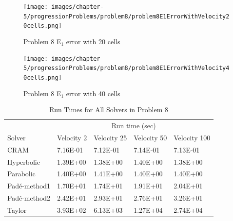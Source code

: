 \clearpage

\begin{figure}[p]
    \centering
    \texttt{[image: images/chapter-5/progressionProblems/problem8/problem8E1ErrorWithVelocity20cells.png]}
    \caption{Problem 8 E${}_{1}$ error with 20 cells}
    \label{fig:problem8_E1_error_20cells}
\end{figure}

\clearpage

\begin{figure}[p]
    \centering
    \texttt{[image: images/chapter-5/progressionProblems/problem8/problem8E1ErrorWithVelocity40cells.png]}
    \caption{Problem 8 E${}_{1}$ error with 40 cells}
    \label{fig:problem8_E1_error_40cells}
\end{figure}

\clearpage

\begin{table}[p]
   \caption{\label{tab:problem8_run_times} Run Times for All Solvers in Problem 8}
   \centering
   \begin{tabular}{lllll}
   \hline
    \multicolumn{1}{c}{} & \multicolumn{4}{c}{Run time (sec)}  \\
    Solver & Velocity 2 & Velocity 25 & Velocity 50 & Velocity 100 \\
   \hline
	CRAM & 7.16E-01 & 7.12E-01	& 7.14E-01 & 7.13E-01 \\
	Hyperbolic & 1.39E+00 & 1.38E+00	& 1.40E+00 & 1.38E+00 \\
	Parabolic & 1.40E+00 & 1.41E+00	& 1.40E+00 & 1.40E+00 \\
	Pad\'e-method1 & 1.70E+01 & 1.74E+01	& 1.91E+01 & 2.04E+01 \\
	Pad\'e-method2 & 2.42E+01 & 2.93E+01	& 2.76E+01 & 3.26E+01 \\
	Taylor & 3.93E+02 & 6.13E+03	& 1.27E+04 & 2.74E+04 \\
   \hline
   \end{tabular}
\end{table}  

\clearpage

